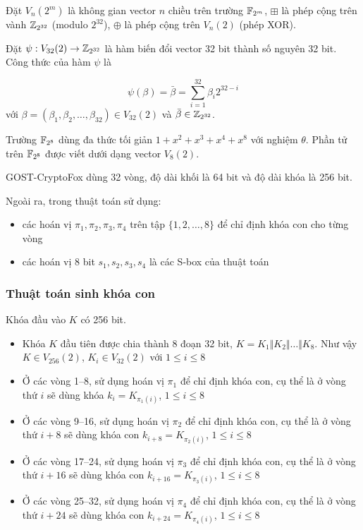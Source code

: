 Đặt $V_{n}(2^m)$ là không gian vector $n$ chiều trên trường $\mathbb{F}_{2^m}$, $\boxplus$ là phép cộng trên vành $\mathbb{Z}_{2^{32}}$ (modulo $2^{32}$), $\oplus$ là phép cộng trên $V_{n}(2)$ (phép XOR).

Đặt $\psi : V_{32}(2) \to \mathbb{Z}_{2^{32}}$ là hàm biến đổi vector 32 bit thành số nguyên 32 bit. Công thức của hàm $\psi$ là

\begin{equation*}
    \psi(\beta) = \bar{\beta} = \sum_{i=1}^{32} \beta_i 2^{32-i}
\end{equation*}
với $\beta = (\beta_1, \beta_2, \ldots, \beta_{32}) \in V_{32}(2)$ và $\bar{\beta} \in \mathbb{Z}_{2^{32}}$.

Trường $\mathbb{F}_{2^8}$ dùng đa thức tối giản $1 + x^2 + x^3 + x^4 + x^8$ với nghiệm $\theta$. Phần tử trên $\mathbb{F}_{2^8}$ được viết dưới dạng vector $V_8(2)$.

GOST-CryptoFox dùng 32 vòng, độ dài khối là 64 bit và độ dài khóa là 256 bit.

Ngoài ra, trong thuật toán sử dụng:

\begin{itemize}
    \item các hoán vị $\pi_1, \pi_2, \pi_3, \pi_4$ trên tập $\{ 1, 2, \ldots, 8 \}$ để chỉ định khóa con cho từng vòng
    \item các hoán vị 8 bit $s_1, s_2, s_3, s_4$ là các S-box của thuật toán
\end{itemize}

\subsubsection*{Thuật toán sinh khóa con}

Khóa đầu vào $K$ có 256 bit.

\begin{itemize}
    \item Khóa $K$ đầu tiên được chia thành 8 đoạn 32 bit, $K = K_1 \Vert K_2 \Vert \ldots \Vert K_8$. Như vậy $K \in V_{256}(2)$, $K_i \in V_{32}(2)$ với $1 \leqslant i \leqslant 8$
    \item Ở các vòng 1--8, sử dụng hoán vị $\pi_1$ để chỉ định khóa con, cụ thể là ở vòng thứ $i$ sẽ dùng khóa $k_i = K_{\pi_1(i)}$, $1 \leqslant i \leqslant 8$
    \item Ở các vòng 9--16, sử dụng hoán vị $\pi_2$ để chỉ định khóa con, cụ thể là ở vòng thứ $i+8$ sẽ dùng khóa con $k_{i+8} = K_{\pi_2(i)}$, $1 \leqslant i \leqslant 8$
    \item Ở các vòng 17--24, sử dụng hoán vị $\pi_3$ để chỉ định khóa con, cụ thể là ở vòng thứ $i+16$ sẽ dùng khóa con $k_{i+16} = K_{\pi_3(i)}$, $1 \leqslant i \leqslant 8$
    \item Ở các vòng 25--32, sử dụng hoán vị $\pi_4$ để chỉ định khóa con, cụ thể là ở vòng thứ $i+24$ sẽ dùng khóa con $k_{i+24} =K_{\pi_4(i)}$, $1 \leqslant i \leqslant 8$
\end{itemize}

